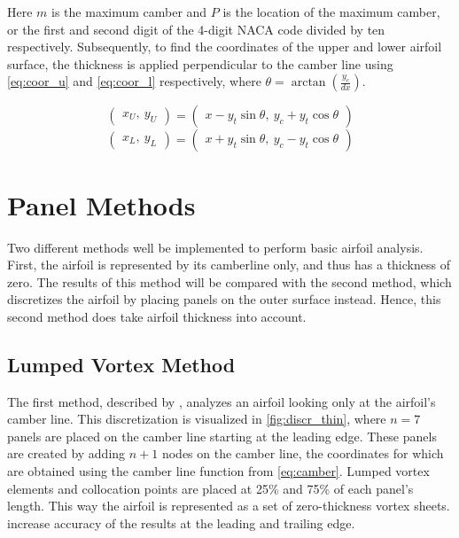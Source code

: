 Here $m$ is the maximum camber and $P$ is the location of the maximum camber, or
the first and second digit of the 4-digit NACA code divided by ten respectively.
Subsequently, to find the coordinates of the upper and lower airfoil
surface, the thickness is applied perpendicular to the camber line using
\autoref{eq:coor_u} and \autoref{eq:coor_l} respectively, where $\theta =
\arctan\left( \frac{y_c}{dx}\right)$.

\begin{equation}
\label{eq:coor_u}
    \left(\begin{array}{l} x_U, \: y_U\end{array}\right) =
    \left(\begin{array}{l} x-y_t \sin \theta, \: y_c+y_t\cos \theta\end{array}\right)
\end{equation}
\begin{equation}
\label{eq:coor_l}
    \left(\begin{array}{l} x_L, \:  y_L\end{array}\right) =
    \left(\begin{array}{l} x+y_t \sin \theta, \: y_c-y_ t \cos \theta\end{array}\right)
\end{equation}

\chapter{Panel Methods}  %
Two different methods well be implemented to perform basic airfoil analysis.
First, the airfoil is represented by its camberline only, and thus has a
thickness of zero. The results of this method will be compared with the second
method, which discretizes the airfoil by placing panels on the outer surface
instead. Hence, this second method does take airfoil thickness into account.

\section{Lumped Vortex Method}
\label{sec:thin}
The first method, described by \citeauthor{katz_plotkin}\cite{katz_plotkin}, analyzes an airfoil
looking only at the airfoil's camber line. This discretization is visualized in
\autoref{fig:discr_thin}, where $n=7$ panels are placed on the camber line starting at
the leading edge. These panels are created by adding $n+1$ nodes on the camber
line, the coordinates for which are obtained using the camber line function from
\autoref{eq:camber}. Lumped vortex elements and collocation points are placed at
25\% and 75\% of each panel's length. This way the airfoil is represented as a
set of zero-thickness vortex sheets.
increase accuracy of the results at the leading and trailing edge.


